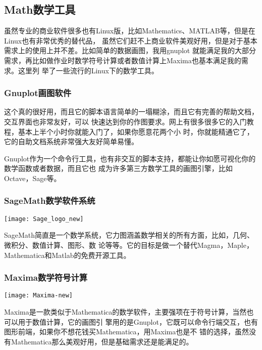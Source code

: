 \documentclass[11pt,fleqn]{book} %
\begin{document}
\subsection{Math数学工具}
虽然专业的商业软件很多也有Linux版，比如Mathematics、MATLAB等，但是在Linux也有非常优秀的替代品，
虽然它们赶不上商业软件美观好用，但是对于基本需求上的使用上并不差。比如简单的数据画图，我用gnuplot
就能满足我的大部分需求，再比如做作业时数学符号计算或者数值计算上Maxima也基本满足我的需求。这里列
举了一些流行的Linux下的数学工具。
\subsubsection{Gnuplot画图软件}
这个真的很好用，而且它的脚本语言简单的一塌糊涂，而且它有完善的帮助文档，交互界面也非常友好，可以
快速达到你的作图要求。网上有很多很多它的入门教程，基本上半个小时你就能入门了，如果你愿意花两个小
时，你就能精通它了，它的自助文档系统非常强大友好简单易懂。

Gnuplot作为一个命令行工具，也有非交互的脚本支持，都能让你如愿可视化你的数学函数或者数据，而且它也
成为许多第三方数学工具的画图引擎，比如Octave，Sage等。
\subsubsection{SageMath数学软件系统}

\vspace{0.5cm}
\begin{center}
  \texttt{[image: Sage\_logo\_new]}
\end{center}

SageMath简直是一个数学系统，它力图涵盖数学相关的所有方面，比如，几何、微积分、数值计算、图形、数
论等等。它的目标是做一个替代Magma，Maple，Mathematica和Matlab的免费开源工具。
\subsubsection{Maxima数学符号计算}
\begin{center}
  \texttt{[image: Maxima-new]}
\end{center}

\vspace{-0.1cm}
Maxima是一款类似于Mathematica的数学软件，主要强项在于符号计算，当然也可以用于数值计算，它的画图引
擎用的是Gnuplot，它既可以命令行端交互，也有图形前端，如果你不想花钱买Mathematica，用Maxima也是不
错的选择，虽然没有Mathematica那么美观好用，但是基础需求还是能满足的。
\end{document}
